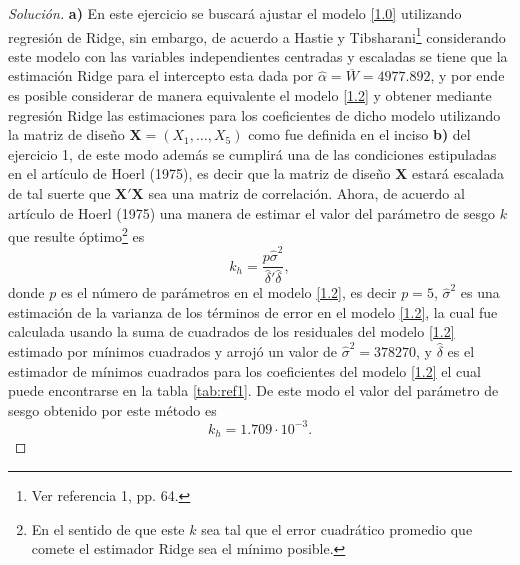 \documentclass[10.5pt,notitlepage]{article}
\newenvironment{solucion}
  {\begin{proof}[Solución]}
  {\end{proof}}
\theoremstyle{plain}
\begin{document}
\begin{solucion}
\textbf{a)}
En este ejercicio se buscará ajustar el modelo \eqref{1.0} utilizando regresión de Ridge, sin embargo, de acuerdo a Hastie y Tibsharani\footnote{Ver referencia 1, pp. 64.} considerando este modelo con las variables independientes centradas y escaladas se tiene que la estimación Ridge para el intercepto esta dada por \(\hat{\alpha} = \overline{W} = 4977.892
\), y por ende es posible considerar de manera equivalente el modelo \eqref{1.2} y obtener mediante regresión Ridge las estimaciones para los coeficientes de dicho modelo utilizando la matriz de diseño \(\mathbf{X} = (X_1, \hdots, X_5)\) como fue definida en el inciso \textbf{b)} del ejercicio 1, de este modo además se cumplirá una de las condiciones estipuladas en el artículo de Hoerl (1975), es decir que la matriz de diseño \(\mathbf{X}\) estará escalada de tal suerte que \(\mathbf{X}'\mathbf{X}\) sea una matriz de correlación. Ahora, de acuerdo al artículo de Hoerl (1975) una manera de estimar el valor del parámetro de sesgo \(\mathit{k}\) que resulte óptimo\footnote{En el sentido de que este \(\mathit{k}\) sea tal que el error cuadrático promedio que comete el estimador Ridge sea el mínimo posible.} es 
\begin{equation*}
    \mathit{k_h} = \frac{p \hat{\sigma}^2}{\hat{\delta}' \hat{\delta}},
\end{equation*}
donde \(p\) es el número de parámetros en el modelo \eqref{1.2}, es decir \(p = 5\), \(\hat{\sigma}^2\) es una estimación de la varianza de los términos de error en el modelo \eqref{1.2}, la cual fue calculada usando la suma de cuadrados de los residuales del modelo \eqref{1.2} estimado por mínimos cuadrados y arrojó un valor de \(\hat{\sigma}^2 = 378270\), y \(\hat{\delta}\) es el estimador de mínimos cuadrados para los coeficientes del modelo \eqref{1.2} el cual puede encontrarse en la tabla \ref{tab:ref1}. De este modo el valor del parámetro de sesgo obtenido por este método es 
\begin{equation}\label{Kho1}
    \mathit{k_h} = 1.709\cdot 10^{-3}. 
\end{equation}


\end{solucion}
\end{document}
